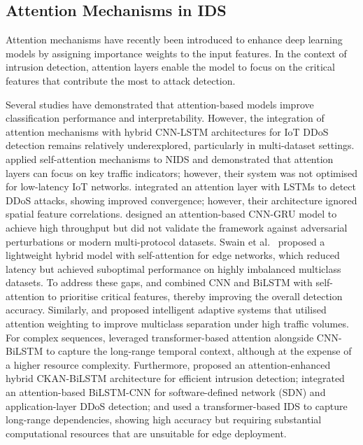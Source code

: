 \documentclass[a4paper,fleqn]{cas-sc}
\begin{document}
\subsection{Attention Mechanisms in IDS}

Attention mechanisms have recently been introduced to enhance deep learning models by assigning importance weights to the input features. In the context of intrusion detection, attention layers enable the model to focus on the critical features that contribute the most to attack detection.

Several studies have demonstrated that attention-based models improve classification performance and interpretability. However, the integration of attention mechanisms with hybrid CNN-LSTM architectures for IoT DDoS detection remains relatively underexplored, particularly in multi-dataset settings. \cite{hosseini2024attention} applied self-attention mechanisms to NIDS and demonstrated that attention layers can focus on key traffic indicators; however, their system was not optimised for low-latency IoT networks. \cite{zhou2021ddos} integrated an attention layer with LSTMs to detect DDoS attacks, showing improved convergence; however, their architecture ignored spatial feature correlations. \cite{gu2022lightweight} designed an attention-based CNN-GRU model to achieve high throughput but did not validate the framework against adversarial perturbations or modern multi-protocol datasets. Swain et al.~\cite{wu2023lightweight} proposed a lightweight hybrid model with self-attention for edge networks, which reduced latency but achieved suboptimal performance on highly imbalanced multiclass datasets. To address these gaps, \cite{dai2024cnnbilstmattention} and \cite{naeem2025attentioncnnbilstm} combined CNN and BiLSTM with self-attention to prioritise critical features, thereby improving the overall detection accuracy. Similarly, \cite{alashjaee2025deep} and \cite{purbia2026iaids} proposed intelligent adaptive systems that utilised attention weighting to improve multiclass separation under high traffic volumes. For complex sequences, \cite{zhang2025cnnbilstmtransformer} leveraged transformer-based attention alongside CNN-BiLSTM to capture the long-range temporal context, although at the expense of a higher resource complexity. Furthermore, \cite{elwhishi2026ckan} proposed an attention-enhanced hybrid CKAN-BiLSTM architecture for efficient intrusion detection; \cite{priyadarshini2023attention} integrated an attention-based BiLSTM-CNN for software-defined network (SDN) and application-layer DDoS detection; and \cite{zhang2023transformer} used a transformer-based IDS to capture long-range dependencies, showing high accuracy but requiring substantial computational resources that are unsuitable for edge deployment.
\end{document}
